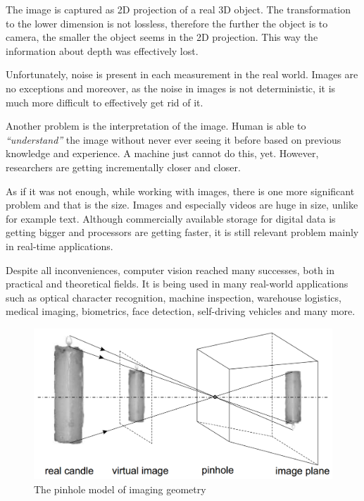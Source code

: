 \documentclass[a4paper,10pt]{article}
\theoremstyle{definition}
\begin{document}
	The image is captured as 2D projection of a real 3D object. The transformation to the lower dimension is not lossless, therefore the further the object is to camera, the smaller the object seems in the 2D projection. This way the information about depth was effectively lost.
	
	Unfortunately, noise is present in each measurement in the real world. Images are no exceptions and moreover, as the noise in images is not deterministic, it is much more difficult to effectively get rid of it.
	
	Another problem is the interpretation of the image. Human is able to \textit{``understand''} the image without never ever seeing it before based on previous knowledge and experience. A machine just cannot do this, yet. However, researchers are getting incrementally closer and closer.
	
	As if it was not enough, while working with images, there is one more significant problem and that is the size. Images and especially videos are huge in size, unlike for example text. Although commercially available storage for digital data is getting bigger and processors are getting faster, it is still relevant problem mainly in real-time applications.
	
	Despite all inconveniences, computer vision reached many successes, both in practical and theoretical fields. It is being used in many real-world applications such as optical character recognition, machine inspection, warehouse logistics, medical imaging, biometrics, face detection, self-driving vehicles and many more. \cite{hartley_zisserman}\cite{szeliski}\cite{sonka}
	
	\begin{figure}[h]
		\begin{center}
			\includegraphics[scale=0.5]{image/cv.png}
			\caption{The pinhole model of imaging geometry\cite{sonka}}
			\label{fig:2}
		\end{center}
	\end{figure}
	
\end{document}
